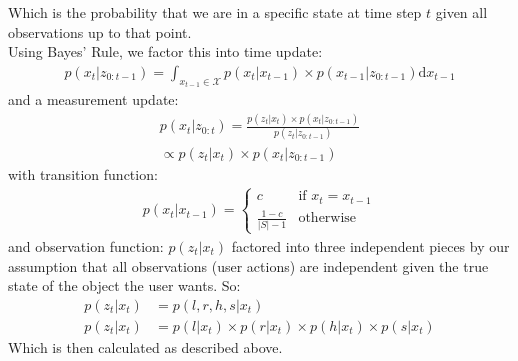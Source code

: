 \documentclass[a4paper, 11pt]{article} %
\begin{document}
Which is the probability that we are in a specific state at time step $t$ given all observations up to that point.\\
Using Bayes' Rule, we factor this into  time update:
\begin{align}
p(x_t | z_{0:t-1}) = \int_{x_{t-1} \in \mathcal{X}} p(x_t|x_{t-1})\times p(x_{t-1} | z_{0:t-1}) \text{d}x_{t-1}
\end{align}
and a measurement update:
\begin{align}
p(x_t |z_{0:t}) = \frac{p(z_t | x_t) \times p(x_t | z_{0:t-1})}{p(z_t | z_{0:t-1})} \\\propto p(z_t | x_t) \times p(x_t | z_{0:t-1})
\end{align}
with transition function:
\begin{align}
p(x_t | x_{t-1}) = \left\{  \begin{array}{ll}
c &\mbox{if } x_t = x_{t-1}\\
\frac{1-c}{|S|-1} &\mbox{otherwise}
\end{array}\right.
\end{align}
and observation function: $p(z_t | x_t)$ factored into three independent pieces by our assumption that all observations (user actions) are independent given the true state of the object the user wants. So:
\begin{align}
p(z_t | x_t) &= p(l, r, h, s | x_t)\\
p(z_t | x_t) &= p(l | x_t) \times p(r | x_t) \times p(h | x_t) \times p(s | x_t)
\end{align}
Which is then calculated as described above.
\end{document}
